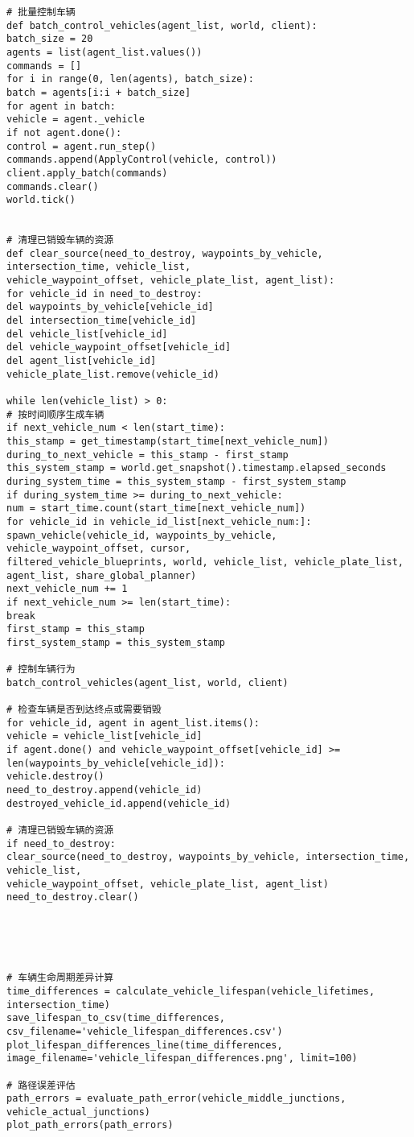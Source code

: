 \begin{lstlisting}
# 批量控制车辆
def batch_control_vehicles(agent_list, world, client):
batch_size = 20
agents = list(agent_list.values())
commands = []
for i in range(0, len(agents), batch_size):
batch = agents[i:i + batch_size]
for agent in batch:
vehicle = agent._vehicle
if not agent.done():
control = agent.run_step()
commands.append(ApplyControl(vehicle, control))
client.apply_batch(commands)
commands.clear()
world.tick()


# 清理已销毁车辆的资源
def clear_source(need_to_destroy, waypoints_by_vehicle, intersection_time, vehicle_list,
vehicle_waypoint_offset, vehicle_plate_list, agent_list):
for vehicle_id in need_to_destroy:
del waypoints_by_vehicle[vehicle_id]
del intersection_time[vehicle_id]
del vehicle_list[vehicle_id]
del vehicle_waypoint_offset[vehicle_id]
del agent_list[vehicle_id]
vehicle_plate_list.remove(vehicle_id)

while len(vehicle_list) > 0:
# 按时间顺序生成车辆
if next_vehicle_num < len(start_time):
this_stamp = get_timestamp(start_time[next_vehicle_num])
during_to_next_vehicle = this_stamp - first_stamp
this_system_stamp = world.get_snapshot().timestamp.elapsed_seconds
during_system_time = this_system_stamp - first_system_stamp
if during_system_time >= during_to_next_vehicle:
num = start_time.count(start_time[next_vehicle_num])
for vehicle_id in vehicle_id_list[next_vehicle_num:]:
spawn_vehicle(vehicle_id, waypoints_by_vehicle, vehicle_waypoint_offset, cursor,
filtered_vehicle_blueprints, world, vehicle_list, vehicle_plate_list, agent_list, share_global_planner)
next_vehicle_num += 1
if next_vehicle_num >= len(start_time):
break
first_stamp = this_stamp
first_system_stamp = this_system_stamp

# 控制车辆行为
batch_control_vehicles(agent_list, world, client)

# 检查车辆是否到达终点或需要销毁
for vehicle_id, agent in agent_list.items():
vehicle = vehicle_list[vehicle_id]
if agent.done() and vehicle_waypoint_offset[vehicle_id] >= len(waypoints_by_vehicle[vehicle_id]):
vehicle.destroy()
need_to_destroy.append(vehicle_id)
destroyed_vehicle_id.append(vehicle_id)

# 清理已销毁车辆的资源
if need_to_destroy:
clear_source(need_to_destroy, waypoints_by_vehicle, intersection_time, vehicle_list,
vehicle_waypoint_offset, vehicle_plate_list, agent_list)
need_to_destroy.clear()





# 车辆生命周期差异计算
time_differences = calculate_vehicle_lifespan(vehicle_lifetimes, intersection_time)
save_lifespan_to_csv(time_differences, csv_filename='vehicle_lifespan_differences.csv')
plot_lifespan_differences_line(time_differences, image_filename='vehicle_lifespan_differences.png', limit=100)

# 路径误差评估
path_errors = evaluate_path_error(vehicle_middle_junctions, vehicle_actual_junctions)
plot_path_errors(path_errors)
	
\end{lstlisting}
